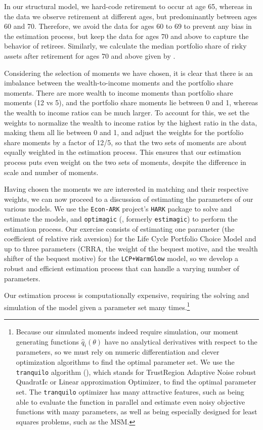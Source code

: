\documentclass{article}
\begin{document}
In our structural model, we hard-code retirement to occur at age 65, whereas in the data we observe retirement at different ages, but predominantly between ages 60 and 70.
Therefore, we avoid the data for ages 60 to 69 to prevent any bias in the estimation process, but keep the data for ages 70 and above to capture the behavior of retirees.
Similarly, we calculate the median portfolio share of risky assets after retirement for ages 70 and above given by \cite{Aboagye2024}.

Considering the selection of moments we have chosen, it is clear that there is an imbalance between the wealth-to-income moments and the portfolio share moments.
There are more wealth to income moments than portfolio share moments (12 vs 5), and the portfolio share moments lie between 0 and 1, whereas the wealth to income ratios can be much larger.
To account for this, we set the weights to normalize the wealth to income ratios by the highest ratio in the data, making them all lie between 0 and 1, and adjust the weights for the portfolio share moments by a factor of 12/5, so that the two sets of moments are about equally weighted in the estimation process.
This ensures that our estimation process puts even weight on the two sets of moments, despite the difference in scale and number of moments.

Having chosen the moments we are interested in matching and their respective weights, we can now proceed to a discussion of estimating the parameters of our various models.
We use the \texttt{Econ-ARK} project's \texttt{HARK} package to solve and estimate the models, and \texttt{optimagic} (\cite{Gabler2022}, formerly \texttt{estimagic}) to perform the estimation process.
Our exercise consists of estimating one parameter (the coefficient of relative risk aversion) for the Life Cycle Portfolio Choice Model and up to three parameters (CRRA, the weight of the bequest motive, and the wealth shifter of the bequest motive) for the \texttt{LCP+WarmGlow} model, so we develop a robust and efficient estimation process that can handle a varying number of parameters. 

Our estimation process is computationally expensive, requiring the solving and simulation of the model given a parameter set many times.\footnote{Because our simulated moments indeed require simulation, our moment generating functions $\hat{q}_i(\theta)$ have no analytical derivatives with respect to the parameters, so we must rely on numeric differentiation and clever optimization algorithms to find the optimal parameter set.
We use the \texttt{tranquilo} algorithm (\cite{Gabler2024}), which stands for TrustRegion Adaptive Noise robust QuadratIc or Linear approximation Optimizer, to find the optimal parameter set.
The \texttt{tranquilo} optimizer has many attractive features, such as being able to evaluate the function in parallel and estimate even noisy objective functions with many parameters, as well as being especially designed for least squares problems, such as the MSM.}
\end{document}
